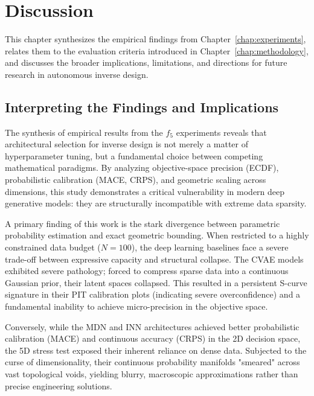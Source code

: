 
\chapter{Discussion}\label{chap:discussion}

This chapter synthesizes the empirical findings from Chapter~\ref{chap:experiments}, relates them to the evaluation criteria introduced in Chapter~\ref{chap:methodology}, and discusses the broader implications, limitations, and directions for future research in autonomous inverse design.

\section{Interpreting the Findings and Implications}\label{sec:discussion_interpretation}

The synthesis of empirical results from the $f_5$ experiments reveals that architectural selection for inverse design is not merely a matter of hyperparameter tuning, but a fundamental choice between competing mathematical paradigms. By analyzing objective-space precision (ECDF), probabilistic calibration (MACE, CRPS), and geometric scaling across dimensions, this study demonstrates a critical vulnerability in modern deep generative models: they are structurally incompatible with extreme data sparsity.

A primary finding of this work is the stark divergence between parametric probability estimation and exact geometric bounding. When restricted to a highly constrained data budget ($N=100$), the deep learning baselines face a severe trade-off between expressive capacity and structural collapse. The CVAE models exhibited severe pathology; forced to compress sparse data into a continuous Gaussian prior, their latent spaces collapsed. This resulted in a persistent S-curve signature in their PIT calibration plots (indicating severe overconfidence) and a fundamental inability to achieve micro-precision in the objective space. 

Conversely, while the MDN and INN architectures achieved better probabilistic calibration (MACE) and continuous accuracy (CRPS) in the 2D decision space, the 5D stress test exposed their inherent reliance on dense data. Subjected to the curse of dimensionality, their continuous probability manifolds "smeared" across vast topological voids, yielding blurry, macroscopic approximations rather than precise engineering solutions.

